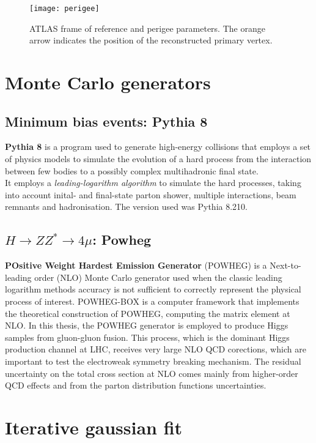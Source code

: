 \documentclass[a4paper,twoside,12pt]{book}
\begin{document}
\begin{appendices}
\begin{figure}
\centering
\texttt{[image: perigee]}
\caption{ATLAS frame of reference and perigee parameters. The orange arrow indicates the position of the reconstructed primary vertex\cite{perigee}.}
\label{fig:appendix:perigee}
\end{figure}

\chapter{Monte Carlo generators}\label{appendix:MC}
\markboth{\ }{\ }

\section{Minimum bias events: Pythia 8}
\textbf{Pythia 8} is a program used to generate high-energy collisions that employs a set of physics
models to simulate the evolution of a hard process from the interaction between few bodies 
to a possibly complex multihadronic final state\cite{Pythia8}. 	\\
It employs a \textit{leading-logarithm algorithm} to simulate the hard processes, 
taking into account inital- and final-state parton shower, multiple interactions, beam remnants
and hadronisation. The version used was Pythia 8.210.

\section{$H \rightarrow ZZ^* \rightarrow 4\mu$: Powheg}
\textbf{POsitive Weight Hardest Emission Generator} (POWHEG) is a Next-to-leading order (NLO) Monte Carlo generator
used when the classic leading logarithm methods accuracy is not sufficient to correctly 
represent the physical process of interest. POWHEG-BOX is a computer framework 
that implements the theoretical construction of POWHEG, computing the matrix element 
at NLO\cite{Powheg}. In this thesis, the POWHEG generator is employed to produce
Higgs samples from gluon-gluon fusion. This process, which is the dominant Higgs production 
channel at LHC, receives very large NLO QCD corections, which are important to test the 
electroweak symmetry breaking mechanism\cite{Powheg_ggH}. The residual uncertainty 
on the total cross section 
at NLO comes mainly from higher-order QCD effects and from the parton distribution
functions uncertainties.

\chapter{Iterative gaussian fit}\label{appendix:gaussFit}


\end{appendices}
\end{document}
